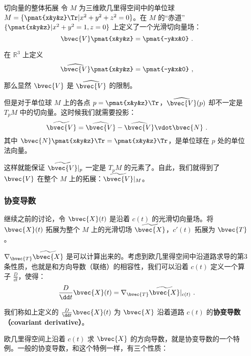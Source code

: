 \begin{example}{切向量的整体拓展}
令 $M$ 为三维欧几里得空间中的单位球 $M=\{\pmat{x&y&z}\Tr|x^2+y^2+z^2=0\}$。在 $M$ 的“赤道”$\{\pmat{x&y&z}|x^2+y^2=1, z=0\}$ 上定义了一个光滑切向量场：
\begin{equation}
\bvec{V}\pmat{x&y&z}=\pmat{-y&x&0}~.
\end{equation}

在 $\mathbb{R}^3$ 上定义
\begin{equation}
\widehat{\bvec{V}}\pmat{x&y&z}=\pmat{-y&x&0}~,
\end{equation}

那么显然 $\bvec{V}$ 是 $\widehat{\bvec{V}}$ 的限制。

但是对于单位球 $M$ 上的各点 $p=\pmat{x&y&z}\Tr$，$\widehat{\bvec{V}}(p)$ 却不一定是 $T_pM$ 中的切向量。这时候我们就需要投影：
\begin{equation}
\widetilde{\bvec{V}}=\widehat{\bvec{V}}-\widehat{\bvec{V}}\vdot\bvec{N}~.
\end{equation}
其中 $\bvec{N}\pmat{x&y&z}\Tr=\pmat{x&y&z}\Tr$，是单位球在 $p$ 处的单位法向量。

这样就能保证 $\widetilde{\bvec{V}}|_p$ 一定是 $T_pM$ 的元素了。自此，我们就得到了 $\bvec{V}$ 在整个 $M$ 上的拓展：$\widetilde{\bvec{V}}|_{M}$。

\end{example}

\subsubsection{协变导数}

继续之前的讨论，令 $\bvec{X}(t)$ 是沿着 $c(t)$ 的光滑切向量场。将 $\bvec{X}(t)$ 拓展为整个 $M$ 上的光滑切场 $\widetilde{\bvec{X}}$，$c'(t)$ 拓展为 $\bvec{T}$。

$\nabla_{\bvec{T}}\widetilde{\bvec{X}}$ 是可以计算出来的。考虑到欧几里得空间中沿道路求导的第3条性质，也就是和方向导数（联络）的相容性，我们可以沿着 $c(t)$ 定义一个算子 $\frac{D}{\dd t}$，使得：
\begin{equation}
\frac{D}{\dd t}\bvec{X}(t)=\nabla_{\bvec{T}}\widetilde{\bvec{X}}|_{c(t)}~.
\end{equation}

我们称如上定义的 $\frac{D}{\dd t}\bvec{X}(t)$ 为 $\bvec{X}$ 沿着道路 $c(t)$ 的\textbf{协变导数（covariant derivative）}。

欧几里得空间上沿着 $c(t)$ 求 $\bvec{X}$ 的方向导数，就是协变导数的一个特例。一般的协变导数，和这个特例一样，有三个性质：


